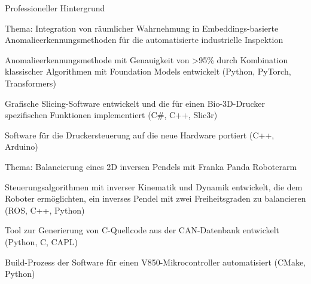 \documentclass[12pt]{article} %
\begin{document}
\begin{ItemizeSection}{Professioneller Hintergrund}
    \item {}
    \begin{ItemizeSubsection}
        \item Thema: Integration von räumlicher Wahrnehmung in Embeddings-basierte \\ Anomalieerkennungsmethoden für die automatisierte industrielle Inspektion
        \item Anomalieerkennungsmethode mit Genauigkeit von >95\% durch Kombination klassischer Algorithmen mit Foundation Models entwickelt (Python, PyTorch, Transformers)
    \end{ItemizeSubsection}

    \item {}
    \begin{ItemizeSubsection}
        \item Grafische Slicing-Software entwickelt und die für einen Bio-3D-Drucker spezifischen Funktionen implementiert (C\#, C++, Slic3r)
        \item Software für die Druckersteuerung auf die neue Hardware portiert (C++, Arduino)
    \end{ItemizeSubsection}

    \item {}
    \begin{ItemizeSubsection}
        \item Thema: Balancierung eines 2D inversen Pendels mit Franka Panda Roboterarm
        \item Steuerungsalgorithmen mit inverser Kinematik und Dynamik entwickelt, die dem Roboter ermöglichten, ein inverses Pendel mit zwei Freiheitsgraden zu balancieren (ROS, C++, Python)
    \end{ItemizeSubsection}

    \item {}
    \begin{ItemizeSubsection}
        \item Tool zur Generierung von C-Quellcode aus der CAN-Datenbank entwickelt (Python, C, CAPL)
        \item Build-Prozess der Software für einen V850-Mikrocontroller automatisiert (CMake, Python)
    \end{ItemizeSubsection}


\end{ItemizeSection}
\end{document}

